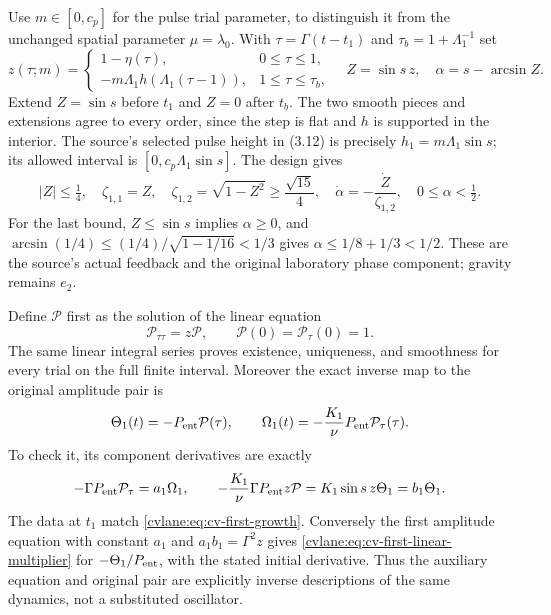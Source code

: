 Use $m\in[0,c_p]$ for the pulse trial parameter, to distinguish it
from the unchanged spatial parameter $\mu=\lambda_0$.
With $\tau=\Gamma(t-t_1)$ and $\tau_b=1+\Lambda_1^{-1}$ set
\begin{equation}
 z(\tau;m)=
 \begin{cases}
  1-\eta(\tau),&0\leq\tau\leq1,\\
  -m\Lambda_1h(\Lambda_1(\tau-1)),&1\leq\tau\leq\tau_b,
 \end{cases}
 \quad Z=\sin s\,z,\quad \alpha=s-\arcsin Z.
 \label{cvlane:eq:cv-first-Z}
\end{equation}
Extend $Z=\sin s$ before $t_1$ and $Z=0$ after $t_b$.
The two smooth pieces and extensions agree to every order, since the
step is flat and $h$ is supported in the interior.
The source's selected pulse height in (3.12) is precisely
$h_1=m\Lambda_1\sin s$; its allowed interval is
$[0,c_p\Lambda_1\sin s]$.
The design gives
\begin{equation}
 |Z|\leq\tfrac14,\quad
 \zeta_{1,1}=Z,\quad
 \zeta_{1,2}=\sqrt{1-Z^2}\geq\frac{\sqrt{15}}4,\quad
 \dot\alpha=-\frac{\dot Z}{\zeta_{1,2}},\quad 0\leq\alpha<\tfrac12.
 \label{cvlane:eq:cv-first-control}
\end{equation}
For the last bound, $Z\leq\sin s$ implies $\alpha\geq0$, and
$\arcsin(1/4)\leq(1/4)/\sqrt{1-1/16}<1/3$ gives
$\alpha\leq1/8+1/3<1/2$. These are the source's actual feedback and
the original laboratory phase component; gravity remains $e_2$.

Define $\mathcal P$ first as the solution of the linear equation
\begin{equation}
 \mathcal P_{\tau\tau}=z\mathcal P,\qquad
 \mathcal P(0)=\mathcal P_\tau(0)=1.
 \label{cvlane:eq:cv-first-linear-multiplier}
\end{equation}
The same linear integral series proves existence, uniqueness, and
smoothness for every trial on the full finite interval. Moreover the
exact inverse map to the original amplitude pair is
\begin{equation}
 \Theta_1(t)=-P_{\rm ent}\mathcal P(\tau),\qquad
 \Omega_1(t)=-\frac{K_1}{\nu}P_{\rm ent}\mathcal P_\tau(\tau).
 \label{cvlane:eq:cv-first-inverse-map}
\end{equation}
To check it, its component derivatives are exactly
\[
 -\Gamma P_{\rm ent}\mathcal P_\tau=a_1\Omega_1,\qquad
 -\frac{K_1}{\nu}\Gamma P_{\rm ent}z\mathcal P
 =K_1\sin s\,z\Theta_1=b_1\Theta_1.
\]
The data at $t_1$ match \eqref{cvlane:eq:cv-first-growth}. Conversely the
first amplitude equation with constant $a_1$ and $a_1b_1=\Gamma^2z$
gives \eqref{cvlane:eq:cv-first-linear-multiplier} for
$-\Theta_1/P_{\rm ent}$, with the stated initial derivative.
Thus the auxiliary equation and original pair are explicitly inverse
descriptions of the same dynamics, not a substituted oscillator.

